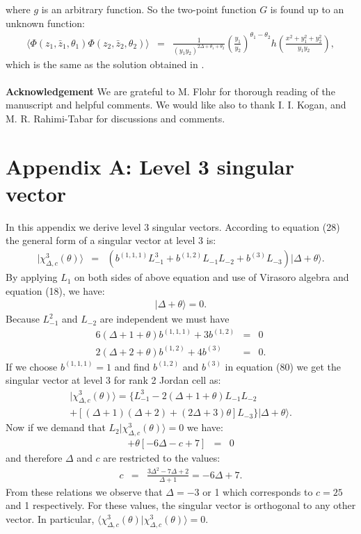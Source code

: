 \documentclass[a4paper,11pt]{article}
\begin{document}
where $g$ is an arbitrary function. So the two-point function $G$
is found up to an unknown function:
\begin{eqnarray}
\langle \Phi(z_{1},\bar{z}_{1},\theta_{1})\Phi(z_{2},\bar{z}_{2},
\theta_{2})\rangle&=&
\frac{1}{(y_{1}y_{2})^{2\Delta+\theta_{1}+\theta_{2}}}
\left(\frac{y_{1}}{y_{2}}\right)^{\theta_{1}-\theta_{2}}
h\left(\frac{x^{2}+y_{1}^{2}+y_{2}^{2}}{y_{1}y_{2}}\right),
\end{eqnarray}
which is the same as the solution obtained in \cite{MR}.\\
\vspace{10mm}\\ {\large {\bf Acknowledgement}} We are grateful to
M. Flohr for thorough reading of the manuscript and helpful
comments. We would like also to thank I. I. Kogan, and M. R.
Rahimi-Tabar for discussions and comments.
\section{Appendix A: Level 3 singular vector}
In this appendix we derive level 3 singular vectors. According to
equation (28) the general form of a singular vector at level 3 is:
\begin{eqnarray}
|\chi_{\Delta,c}^{3}(\theta)\rangle
&=&(b^{(1,1,1)}L^{3}_{-1}+b^{(1,2)}L_{-1}L_{-2}+b^{(3)}L_{-3})|\Delta+\theta
\rangle.
\end{eqnarray}
By applying $L_{1}$ on both sides of above equation and use of
Virasoro algebra and equation (18), we have:
\begin{eqnarray}
[6b^{(1,1,1)}(\Delta+1+\theta)L^{2}_{-1}+b^{(1,2)}(3L^{2}_{-1}+2(\Delta+2+\theta)L_{-2})+4b^{(3)}L_{-2}]|\Delta+\theta\rangle=0.
\end{eqnarray}
Because $L_{-1}^{2}$ and $L_{-2}$ are independent we must have
\begin{eqnarray}
6(\Delta+1+\theta)b^{(1,1,1)}+3b^{(1,2)}&=&0 \nonumber\\
2(\Delta+2+\theta)b^{(1,2)}+4b^{(3)}&=&0.
\end{eqnarray}
If we choose $b^{(1,1,1)}=1$ and find $b^{(1,2)}$ and $b^{(3)}$ in
equation (80) we get the singular vector at level 3 for rank 2
Jordan cell as:
\begin{eqnarray}
|\chi_{\Delta,c}^{3}(\theta)\rangle=
\{L^{3}_{-1}-2(\Delta+1+\theta)L_{-1}L_{-2}\nonumber\\
+[(\Delta+1)(\Delta+2)+(2\Delta+3)\theta
] L_{-3}\}|\Delta+\theta\rangle.
\end{eqnarray}
Now if we demand that $L_{2}|\chi^{3}_{\Delta,c}(\theta)\rangle=0$
we have:
\begin{eqnarray}
[-3\Delta^{2}+7\Delta-2-c(\Delta+1)]+\theta[-6\Delta-c+7]&=&0
\end{eqnarray}
and therefore $\Delta$ and $c$ are restricted to the values:
\begin{eqnarray}
c&=&\frac{3\Delta^{2}-7\Delta+2}{\Delta+1}=-6\Delta+7.
\end{eqnarray}
From these relations we observe that $\Delta=-3$ or 1 which
corresponds to $c=25$ and 1 respectively. For these values, the
singular vector is orthogonal to any other vector. In particular,
$\langle\chi_{\Delta,c}^{3}(\theta)|\chi_{\Delta,c}^{3}(\theta)\rangle=0$.
\end{document}
